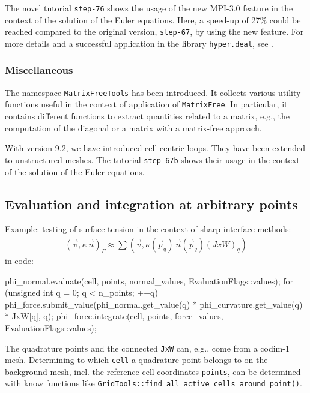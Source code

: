 \documentclass{ansarticle-preprint}
\begin{document}
The novel tutorial \texttt{step-76} shows the usage of the new MPI-3.0 feature
 in the context of the solution
of the Euler equations. Here, a speed-up of 27\% could be reached compared to the
original version, \texttt{step-67}, by using the new feature.
For more details and a successful application in the library \texttt{hyper.deal}, see \citep{munch2020hyperdeal}.

\subsubsection{Miscellaneous}

The namespace \texttt{MatrixFreeTools} has been introduced. It collects various utility
functions useful in the context of application of \texttt{MatrixFree}. In particular,
it contains different functions to extract quantities related to a matrix, e.g., the 
computation of the diagonal or a matrix with a matrix-free approach.

With version 9.2, we have introduced cell-centric loops. They have been extended to unstructured
meshes. The tutorial \texttt{step-67b} shows their usage in the context of the solution
of the Euler equations.



\subsection{Evaluation and integration at arbitrary points}
\label{subsec:fepointvalues}

Example: testing of surface tension in the context of sharp-interface methods:
\begin{align*}
\left(\vec{v}, \kappa \, \vec{n}\right)_\Gamma
\approx
\sum\left(\vec{v}, \kappa(\vec{p}_q) \, \vec{n}(\vec{p}_q) (JxW)_q\right)
\end{align*}
in code:
\begin{c++}
phi_normal.evaluate(cell, points, normal_values, EvaluationFlags::values);
for (unsigned int q = 0; q < n_points; ++q)
   phi_force.submit_value(phi_normal.get_value(q) * 
                          phi_curvature.get_value(q) * JxW[q], q);
phi_force.integrate(cell, points, force_values, EvaluationFlags::values);
\end{c++}
The quadrature points and the connected \texttt{JxW} can, e.g., come from a 
codim-1 mesh. Determining to which \texttt{cell} a quadrature point belongs
to on the background mesh, incl. the reference-cell coordinates \texttt{points},
can be determined with know functions like \texttt{GridTools::find\_all\_active\_cells\_around\_point()}.
\end{document}
